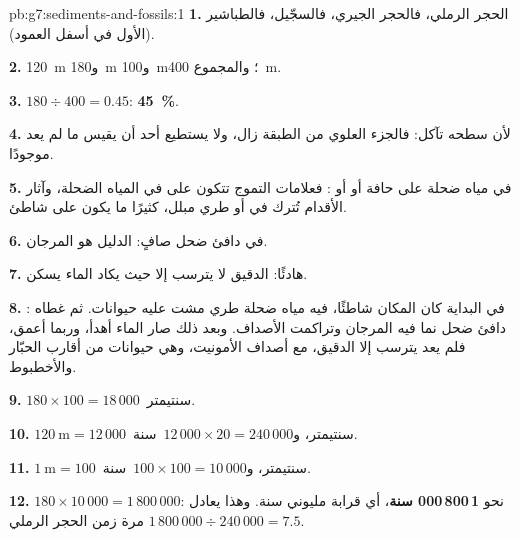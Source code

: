 \begin{solution}{pb:g7:sediments-and-fossils:1}
\textbf{1.} الحجر الرملي، فالحجر الجيري، فالسجّيل، فالطباشير (الأول في
أسفل العمود).

\textbf{2.} \qty{120}{m} و\qty{180}{m} و\qty{100}{m}؛ والمجموع
\qty{400}{m}.

\textbf{3.} $180 \div 400 = 0.45$: \textbf{45~\%}.

\textbf{4.} لأن سطحه تآكل: فالجزء العلوي من الطبقة زال، ولا يستطيع أحد
أن يقيس ما لم يعد موجودًا.

\textbf{5.} في مياه ضحلة على حافة  أو  أو : فعلامات التموج
تتكون على  في المياه الضحلة، وآثار الأقدام تُترك في  أو  طري
مبلل، كثيرًا ما يكون على شاطئ.

\textbf{6.} في  دافئ ضحل صافٍ: الدليل هو المرجان.

\textbf{7.} هادئًا:  الدقيق لا يترسب إلا حيث يكاد الماء يسكن.

\textbf{8.} في البداية كان المكان شاطئًا، فيه مياه ضحلة  طري مشت عليه
حيوانات. ثم غطاه :  دافئ ضحل نما فيه المرجان وتراكمت الأصداف.
وبعد ذلك صار الماء أهدأ، وربما أعمق، فلم يعد يترسب إلا  الدقيق، مع
أصداف الأمونيت، وهي حيوانات من أقارب الحبّار والأخطبوط.

\textbf{9.} $180 \times 100 = 18\,000$~سنتيمتر.

\textbf{10.} $120~\text{m} = 12\,000$~سنتيمتر، و$12\,000 \times 20 =
240\,000$~سنة.

\textbf{11.} $1~\text{m} = 100$~سنتيمتر، و$100 \times 100 = 10\,000$~سنة.

\textbf{12.} $180 \times 10\,000 = 1\,800\,000$: نحو
\textbf{1\,800\,000 سنة}، أي قرابة مليوني سنة. وهذا يعادل
$1\,800\,000 \div 240\,000 = 7.5$ مرة زمن الحجر الرملي.
\end{solution}
